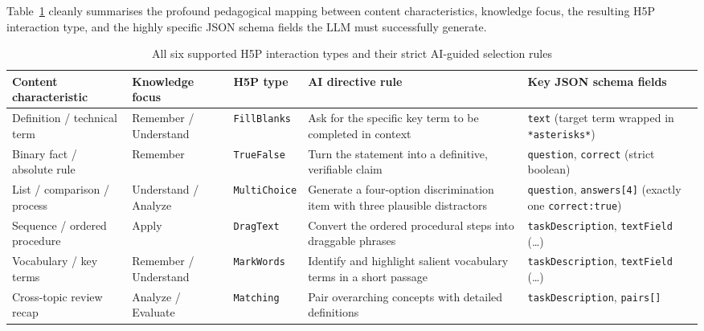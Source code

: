 Table~\ref{tab:pattern_matrix} cleanly summarises the profound pedagogical mapping between content characteristics, knowledge focus, the resulting H5P interaction type, and the highly specific JSON schema fields the LLM must successfully generate.

\begin{table}[H]
  \centering
  \begin{tabularx}{\linewidth}{>{\raggedright\arraybackslash}p{2.2cm} >{\raggedright\arraybackslash}p{1.8cm} l >{\raggedright\arraybackslash}X >{\raggedright\arraybackslash}X}
    \toprule
    \textbf{Content characteristic} & \textbf{Knowledge focus} & \textbf{H5P type} & \textbf{AI directive rule} & \textbf{Key JSON schema fields} \\
    \midrule
    Definition / technical term  & Remember / Understand  & \texttt{FillBlanks}  & Ask for the specific key term to be completed in context & \texttt{text} (target term wrapped in \texttt{*asterisks*}) \\
    \addlinespace
    Binary fact / absolute rule  & Remember  & \texttt{TrueFalse}   & Turn the statement into a definitive, verifiable claim & \texttt{question}, \texttt{correct} (strict boolean) \\
    \addlinespace
    List / comparison / process  & Understand / Analyze  & \texttt{MultiChoice} & Generate a four-option discrimination item with three plausible distractors & \texttt{question}, \texttt{answers[4]} (exactly one \texttt{correct:true}) \\
    \addlinespace
    Sequence / ordered procedure & Apply  & \texttt{DragText}    & Convert the ordered procedural steps into draggable phrases & \texttt{taskDescription}, \texttt{textField} (\dots) \\
    \addlinespace
    Vocabulary / key terms       & Remember / Understand  & \texttt{MarkWords}   & Identify and highlight salient vocabulary terms in a short passage & \texttt{taskDescription}, \texttt{textField} (\dots) \\
    \addlinespace
    Cross-topic review recap     & Analyze / Evaluate  & \texttt{Matching}    & Pair overarching concepts with detailed definitions & \texttt{taskDescription}, \texttt{pairs[]} \\
    \bottomrule
  \end{tabularx}
  \small %
  \caption{All six supported H5P interaction types and their strict AI-guided selection rules}
  \label{tab:pattern_matrix}
\end{table}

